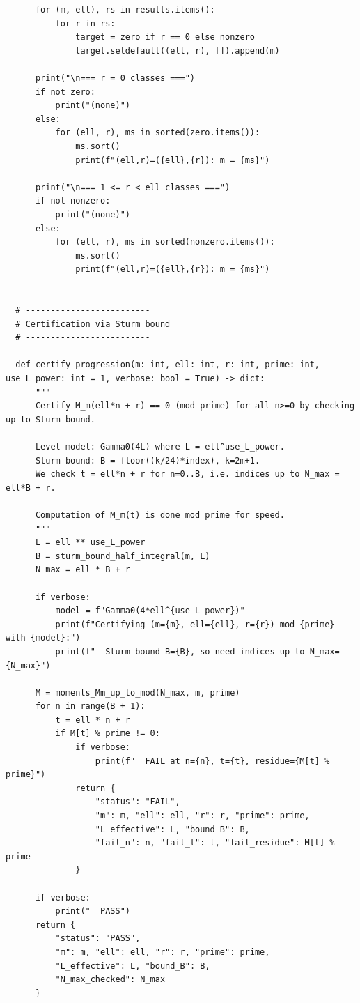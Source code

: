 \documentclass[11pt]{article}
\theoremstyle{definition}
\theoremstyle{remark}
\begin{document}
\begin{verbatim}
      for (m, ell), rs in results.items():
          for r in rs:
              target = zero if r == 0 else nonzero
              target.setdefault((ell, r), []).append(m)

      print("\n=== r = 0 classes ===")
      if not zero:
          print("(none)")
      else:
          for (ell, r), ms in sorted(zero.items()):
              ms.sort()
              print(f"(ell,r)=({ell},{r}): m = {ms}")

      print("\n=== 1 <= r < ell classes ===")
      if not nonzero:
          print("(none)")
      else:
          for (ell, r), ms in sorted(nonzero.items()):
              ms.sort()
              print(f"(ell,r)=({ell},{r}): m = {ms}")


  # -------------------------
  # Certification via Sturm bound
  # -------------------------

  def certify_progression(m: int, ell: int, r: int, prime: int, use_L_power: int = 1, verbose: bool = True) -> dict:
      """
      Certify M_m(ell*n + r) == 0 (mod prime) for all n>=0 by checking up to Sturm bound.

      Level model: Gamma0(4L) where L = ell^use_L_power.
      Sturm bound: B = floor((k/24)*index), k=2m+1.
      We check t = ell*n + r for n=0..B, i.e. indices up to N_max = ell*B + r.

      Computation of M_m(t) is done mod prime for speed.
      """
      L = ell ** use_L_power
      B = sturm_bound_half_integral(m, L)
      N_max = ell * B + r

      if verbose:
          model = f"Gamma0(4*ell^{use_L_power})"
          print(f"Certifying (m={m}, ell={ell}, r={r}) mod {prime} with {model}:")
          print(f"  Sturm bound B={B}, so need indices up to N_max={N_max}")

      M = moments_Mm_up_to_mod(N_max, m, prime)
      for n in range(B + 1):
          t = ell * n + r
          if M[t] % prime != 0:
              if verbose:
                  print(f"  FAIL at n={n}, t={t}, residue={M[t] % prime}")
              return {
                  "status": "FAIL",
                  "m": m, "ell": ell, "r": r, "prime": prime,
                  "L_effective": L, "bound_B": B,
                  "fail_n": n, "fail_t": t, "fail_residue": M[t] % prime
              }

      if verbose:
          print("  PASS")
      return {
          "status": "PASS",
          "m": m, "ell": ell, "r": r, "prime": prime,
          "L_effective": L, "bound_B": B,
          "N_max_checked": N_max
      }



\end{verbatim}
\end{document}
